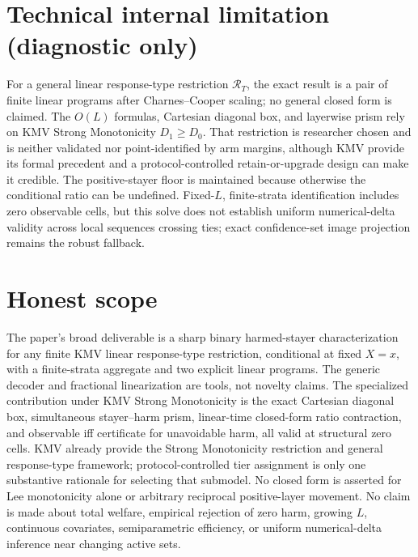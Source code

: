 \documentclass{article}
\begin{document}
\section*{Technical internal limitation (diagnostic only)}

For a general linear response-type restriction \(\mathcal R_T\), the exact result is a pair of finite linear programs after Charnes--Cooper scaling; no general closed form is claimed. The \(O(L)\) formulas, Cartesian diagonal box, and layerwise prism rely on KMV Strong Monotonicity \(D_1\ge D_0\). That restriction is researcher chosen and is neither validated nor point-identified by arm margins, although KMV provide its formal precedent and a protocol-controlled retain-or-upgrade design can make it credible. The positive-stayer floor is maintained because otherwise the conditional ratio can be undefined. Fixed-\(L\), finite-strata identification includes zero observable cells, but this solve does not establish uniform numerical-delta validity across local sequences crossing ties; exact confidence-set image projection remains the robust fallback.

\section{Honest scope}

The paper's broad deliverable is a sharp binary harmed-stayer characterization for any finite KMV linear response-type restriction, conditional at fixed \(X=x\), with a finite-strata aggregate and two explicit linear programs. The generic decoder and fractional linearization are tools, not novelty claims. The specialized contribution under KMV Strong Monotonicity is the exact Cartesian diagonal box, simultaneous stayer--harm prism, linear-time closed-form ratio contraction, and observable iff certificate for unavoidable harm, all valid at structural zero cells. KMV already provide the Strong Monotonicity restriction and general response-type framework; protocol-controlled tier assignment is only one substantive rationale for selecting that submodel. No closed form is asserted for Lee monotonicity alone or arbitrary reciprocal positive-layer movement. No claim is made about total welfare, empirical rejection of zero harm, growing \(L\), continuous covariates, semiparametric efficiency, or uniform numerical-delta inference near changing active sets.
\end{document}
